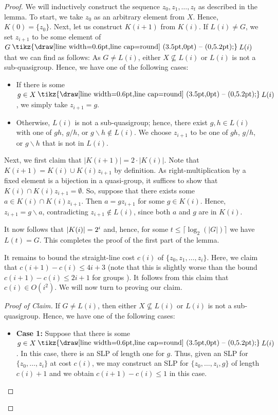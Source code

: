 \documentclass{article}
\newcommand{\abs}[1]{\left|\mathinner{#1}\right|}
\renewcommand{\setminus}{\mysetminus}
\newcommand{\mysetminusD}{\raisebox{.8pt}{\hbox{\tikz{\draw[line width=0.6pt,line cap=round] (3.5pt,0pt) -- (0,5.2pt);}}}}
\newcommand{\mysetminusT}{\mysetminusD}
\newcommand{\mysetminusS}{\raisebox{.5pt}{\hbox{\tikz{\draw[line width=0.45pt,line cap=round] (2.2pt,0) -- (0,3.8pt);}}}}
\newcommand{\mysetminusSS}{\raisebox{.35pt}{\hbox{\tikz{\draw[line width=0.4pt,line cap=round] (1.5pt,0) -- (0,2.8pt);}}}}
\newcommand{\mysetminus}{\mathbin{\mathchoice{\mysetminusD}{\mysetminusT}{\mysetminusS}{\mysetminusSS}}}
\begin{document}
\begin{proof}
 We will inductively construct the sequence $z_0,z_{1}, \ldots, z_{t}$ as described in the lemma. To start, we take $z_0$ as an arbitrary element from $X$. Hence,  $K(0) = \{z_0\}$. 
Next, let us construct $K(i+1)$ from $K(i)$. If $L(i) \neq G$, we set $z_{i+1}$ to be some  element of $G \setminus L(i)$ that we can find as follows:
As $G \neq L(i)$, either $X \not\subseteq L(i)$ or $L(i)$ is not a sub-quasigroup. Hence, we have one of the following cases:
\begin{itemize}
    \item  If there is some $g \in X \setminus L(i)$, we simply take $z_{i+1} = g$.


    \item Otherwise, $L(i)$ is not a sub-quasigroup; hence, there exist $g,h \in L(i)$ with one of $gh$, $g/h$, or $g\backslash h \not \in L(i)$. We choose $z_{i+1}$ to be one of $gh$, $g/h$, or $g\backslash h$ that is not in $L(i)$.
    
\end{itemize} 



Next, we first claim that $|K(i+1)| = 2 \cdot |K(i)|$.
Note that $K(i+1)= K(i) \cup K(i)z_{i+1}$ by definition.
As right-multiplication by a fixed element is a bijection in a quasi-group, it suffices to show that $K(i) \cap K(i)z_{i+1} = \emptyset$.
So, suppose that there exists some $a \in K(i) \cap K(i)z_{i+1}$. Then $a = gz_{i+1}$ for some $g \in K(i)$. Hence, $z_{i+1} = g\backslash a$, contradicting $z_{i+1} \not\in L(i)$, since both $a$ and $g$ are in $K(i)$. 

It now follows that $\abs{K(i)} = 2^i$ and, hence, for some $t \leq \lceil \log_{2}(|G|) \rceil$ we have $L(t) = G$. This completes the proof of the first part of the lemma.


\iffalse

It remains to bound the straight-line cost $c(i)$ of $\{z_0, z_{1}, \ldots, z_{i}\}$. Here, we claim that $c(i+1) - c(i) \leq 4i+3$ (note that this is slightly worse than the bound $c(i+1) - c(i) \leq 2i+1$ for groups \cite{BabaiSzemeredi}). It follows from this claim that $c(i) \in O(i^2)$. We will now turn to proving our claim.

\begin{proof}[Proof of Claim]
If $G \neq L(i)$, then either $X \not\subseteq L(i)$ or $L(i)$ is not a sub-quasigroup. Hence, we have one of the following cases:
\begin{itemize}
    \item \textbf{Case 1:} Suppose that there is some $g \in X \setminus L(i)$. In this case, there is an SLP of length one for $g$.
    Thus, given an SLP for $\{ z_0, \ldots, z_i\}$ at cost $c(i)$, we may construct an SLP for $\{ z_0, \ldots, z_i,g\}$ of length $c(i) + 1$ and we obtain $c(i+1) - c(i) \leq 1$ in this case.



\end{itemize}
\end{proof}
\end{proof}
\end{document}
